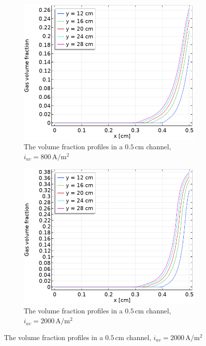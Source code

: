 \begin{figure}[H]
\centering
\begin{subfigure}{.5\textwidth}
  \centering
  \includegraphics[width=1\linewidth]{volumefractionprofilenosaff5mm800A.png}
  \caption{The volume fraction profiles in a $0.5 \, \mathrm{cm}$ channel, $i_{av}=800 \, \mathrm{A/m^2}$}
\end{subfigure}%
\begin{subfigure}{.5\textwidth}
  \centering
  \includegraphics[width=1\linewidth]{volumefractionprofilenosaff5mm2000A.png}
  \caption{The volume fraction profiles in a $0.5 \, \mathrm{cm}$ channel, $i_{av}=2000 \, \mathrm{A/m^2}$}

\end{subfigure}
\end{figure}
